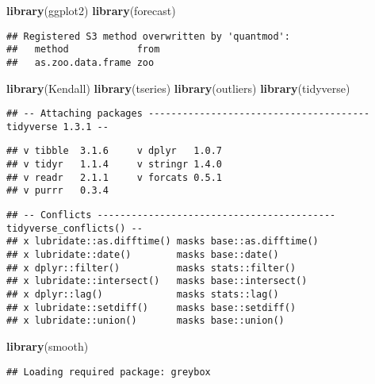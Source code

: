 \documentclass[
]{article}
\newenvironment{Shaded}{\begin{snugshade}}{\end{snugshade}}
\newcommand{\KeywordTok}[1]{\textcolor[rgb]{0.13,0.29,0.53}{\textbf{#1}}}
\newcommand{\NormalTok}[1]{#1}
\begin{document}
\begin{Shaded}
\begin{Highlighting}[]
\KeywordTok{library}\NormalTok{(ggplot2)}
\KeywordTok{library}\NormalTok{(forecast)  }
\end{Highlighting}
\end{Shaded}

\begin{verbatim}
## Registered S3 method overwritten by 'quantmod':
##   method            from
##   as.zoo.data.frame zoo
\end{verbatim}

\begin{Shaded}
\begin{Highlighting}[]
\KeywordTok{library}\NormalTok{(Kendall)}
\KeywordTok{library}\NormalTok{(tseries)}
\KeywordTok{library}\NormalTok{(outliers)}
\KeywordTok{library}\NormalTok{(tidyverse)}
\end{Highlighting}
\end{Shaded}

\begin{verbatim}
## -- Attaching packages --------------------------------------- tidyverse 1.3.1 --
\end{verbatim}

\begin{verbatim}
## v tibble  3.1.6     v dplyr   1.0.7
## v tidyr   1.1.4     v stringr 1.4.0
## v readr   2.1.1     v forcats 0.5.1
## v purrr   0.3.4
\end{verbatim}

\begin{verbatim}
## -- Conflicts ------------------------------------------ tidyverse_conflicts() --
## x lubridate::as.difftime() masks base::as.difftime()
## x lubridate::date()        masks base::date()
## x dplyr::filter()          masks stats::filter()
## x lubridate::intersect()   masks base::intersect()
## x dplyr::lag()             masks stats::lag()
## x lubridate::setdiff()     masks base::setdiff()
## x lubridate::union()       masks base::union()
\end{verbatim}

\begin{Shaded}
\begin{Highlighting}[]
\KeywordTok{library}\NormalTok{(smooth)}
\end{Highlighting}
\end{Shaded}

\begin{verbatim}
## Loading required package: greybox
\end{verbatim}
\end{document}
